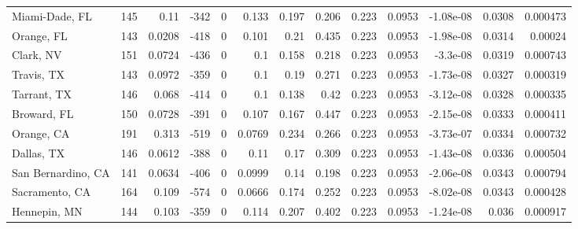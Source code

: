 \documentclass[12pt,letterpaper]{article}
\begin{document}
\begin{appendices}
\begin{sidewaystable}
{\begin{tabular}{lrrrrrrrrrrrr}
 Miami-Dade, FL     & 145   & 0.11    & -342   &     0 &          0.133  &            0.197 &         0.206  &        0.223 &       0.0953 &        -1.08e-08 &           0.0308  &        0.000473 \\
 Orange, FL         & 143   & 0.0208  & -418   &     0 &          0.101  &            0.21  &         0.435  &        0.223 &       0.0953 &        -1.98e-08 &           0.0314  &        0.00024  \\
 Clark, NV          & 151   & 0.0724  & -436   &     0 &          0.1    &            0.158 &         0.218  &        0.223 &       0.0953 &        -3.3e-08  &           0.0319  &        0.000743 \\
 Travis, TX         & 143   & 0.0972  & -359   &     0 &          0.1    &            0.19  &         0.271  &        0.223 &       0.0953 &        -1.73e-08 &           0.0327  &        0.000319 \\
 Tarrant, TX        & 146   & 0.068   & -414   &     0 &          0.1    &            0.138 &         0.42   &        0.223 &       0.0953 &        -3.12e-08 &           0.0328  &        0.000335 \\
 Broward, FL        & 150   & 0.0728  & -391   &     0 &          0.107  &            0.167 &         0.447  &        0.223 &       0.0953 &        -2.15e-08 &           0.0333  &        0.000411 \\
 Orange, CA         & 191   & 0.313   & -519   &     0 &          0.0769 &            0.234 &         0.266  &        0.223 &       0.0953 &        -3.73e-07 &           0.0334  &        0.000732 \\
 Dallas, TX         & 146   & 0.0612  & -388   &     0 &          0.11   &            0.17  &         0.309  &        0.223 &       0.0953 &        -1.43e-08 &           0.0336  &        0.000504 \\
 San Bernardino, CA & 141   & 0.0634  & -406   &     0 &          0.0999 &            0.14  &         0.198  &        0.223 &       0.0953 &        -2.06e-08 &           0.0343  &        0.000794 \\
 Sacramento, CA     & 164   & 0.109   & -574   &     0 &          0.0666 &            0.174 &         0.252  &        0.223 &       0.0953 &        -8.02e-08 &           0.0343  &        0.000428 \\
 Hennepin, MN       & 144   & 0.103   & -359   &     0 &          0.114  &            0.207 &         0.402  &        0.223 &       0.0953 &        -1.24e-08 &           0.036   &        0.000917 \\

\end{tabular}}
\end{sidewaystable}
\end{appendices}
\end{document}
